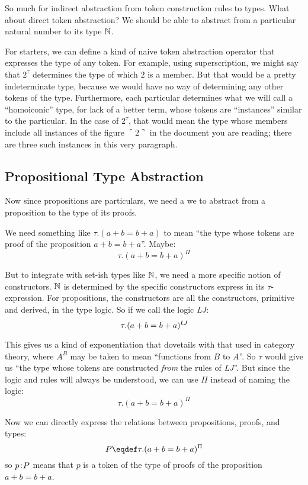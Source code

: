 \documentclass{article}
\begin{document}
So much for indirect abstraction from token construction rules to
types. What about direct token abstraction? We should be able to
abstract from a particular natural number to its type \(\mathbb{N}\).

For starters, we can define a kind of naive token abstraction operator
that expresses the type of any token. For example, using
superscription, we might say that \(2^{\tau}\) determines the type of
which \(2\) is a member. But that would be a pretty indeterminate
type, because we would have no way of determining any other tokens of
the type. Furthermore, each particular determines what we will call a
``homoiconic'' type, for lack of a better term, whose tokens are
``instances'' similar to the particular. In the case of \(2^{\tau}\),
that would mean the type whose members include all instances of the
figure \(\ulcorner 2\urcorner\) in the document you are reading; there
are three such instances in this very paragraph.

\subsection{Propositional Type Abstraction}

Now since propositions are particulars, we need a we to abstract from
a proposition to the type of its proofs.

We need something like \(\tau.(a+b=b+a)\) to mean ``the type whose tokens are proof of the proposition \(a+b=b+a\)''.  Maybe:
\[\tau.(a+b=b+a)^{\Pi}\]

But to integrate with set-ish types like \(\mathbb{N}\), we need a more
specific notion of constructors. \(\mathbb{N}\) is determined by the
specific constructors express in its \(\tau\)-expression. For
propositions, the constructors are all the constructors, primitive and
derived, in the type logic. So if we call the logic \textsf{\slshape LJ}:
\[\tau.(a+b=b+a)^{\textsf{\slshape LJ}}\]

This gives us a kind of exponentiation that dovetails with that used
in category theory, where \(A^B\) may be taken to mean ``functions
from \(B\) to \(A\)''. So \(\tau\) would give us ``the type whose
tokens are constructed \textit{from} the rules of \textsf{\slshape
  LJ}''. But since the logic and rules will always be understood, we
can use \(\Pi\) instead of naming the logic:
\[\tau.(a+b=b+a)^{\Pi}\]

Now we can directly express the relations between propositions,
proofs, and types:
\[P\defeq\tau.(a+b=b+a)^{\Pi}\]
so \(p\hspace{1pt}\mathpunct{:}\hspace{-1pt}P\) means that \(p\) is a token of the type of proofs of
the proposition \(a+b=b+a\).
\end{document}
